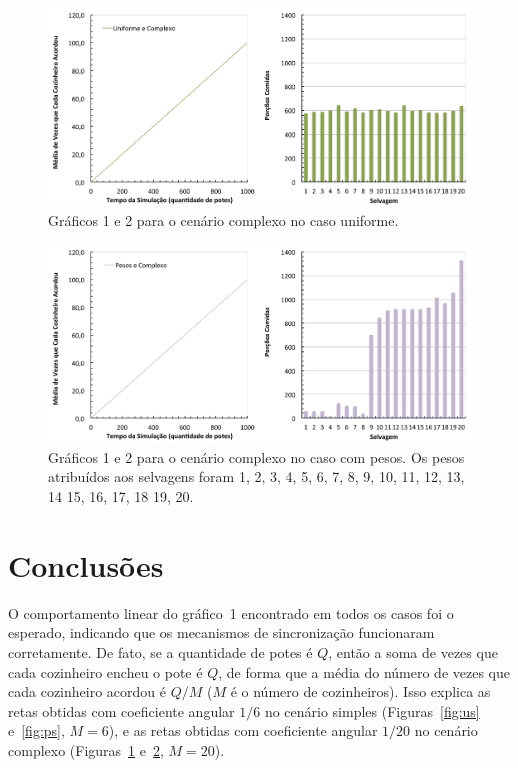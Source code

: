 \documentclass[11pt,a4paper]{article}
\begin{document}
\begin{figure}[htbp]
  \begin{center} 
    \includegraphics[scale=0.5]{uniforme_complexo.pdf}
    \caption{Gráficos 1 e 2 para o cenário complexo no caso uniforme.}
    \label{fig:uc}
  \end{center}
\end{figure}
%
\begin{figure}[htbp]
  \begin{center} 
    \includegraphics[scale=0.5]{pesos_complexo.pdf}
    \caption{Gráficos 1 e 2 para o cenário complexo no caso com pesos. Os pesos atribuídos aos 
    selvagens foram 1, 2, 3, 4, 5, 6, 7, 8, 9, 10, 11, 12, 13, 14 15, 16, 17, 18 19, 20.}
    \label{fig:pc}
  \end{center}
\end{figure}


\section{Conclusões}
\label{sec:conc}

O comportamento linear do gráfico~1 encontrado em todos os casos foi o esperado, indicando que os 
mecanismos de sincronização funcionaram corretamente. De fato, se a quantidade de potes é $Q$, então 
a soma de vezes que cada cozinheiro encheu o pote é $Q$, de forma que a média do número de vezes que 
cada cozinheiro acordou é $Q/M$ ($M$ é o número de cozinheiros). Isso explica as retas obtidas com 
coeficiente angular $1/6$ no cenário simples (Figuras~\ref{fig:us} e~\ref{fig:ps}, $M = 6$), e as 
retas obtidas com coeficiente angular $1/20$ no cenário complexo (Figuras~\ref{fig:uc} 
e~\ref{fig:pc}, $M = 20$).
\end{document}
